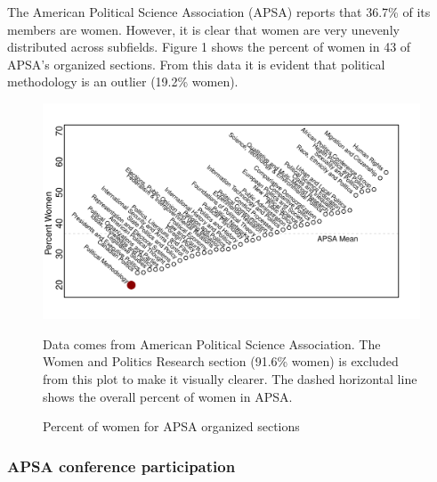 \documentclass[12pt]{texMemo}
\begin{document}
The American Political Science Association (APSA) reports that 36.7\% of its members are women.  However, it is clear that women are very unevenly distributed across subfields.  Figure 1 shows the percent of women in 43 of APSA's organized sections.
From this data it is evident that political methodology is an outlier (19.2\% women).
\begin{figure}[h!]
\caption{Percent of women for APSA organized sections}
\vspace{-.5in}
\begin{center}
\includegraphics[scale=.85]{sections}
\end{center}

\vspace{-1cm}
\footnotesize Data comes from American Political Science Association.  The Women and Politics Research section (91.6\% women) is excluded from this plot to make it visually clearer. The dashed horizontal line shows the overall percent of women in APSA. 
\end{figure}

\newpage

\subsubsection*{APSA conference participation}
\end{document}
